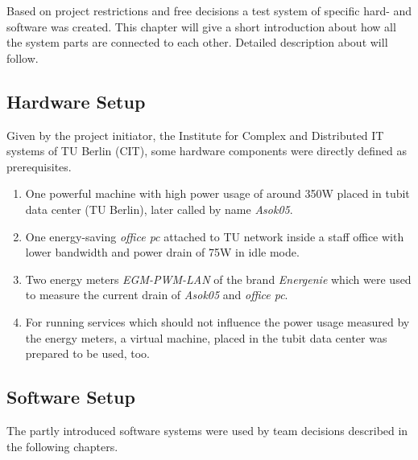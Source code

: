 Based on project restrictions and free decisions a test system of specific hard- and software was created. This chapter will give a short introduction about how all the system parts are connected to each other. Detailed description about will follow.

\subsection{Hardware Setup}

Given by the project initiator, the Institute for Complex and Distributed IT systems of TU Berlin (CIT), some hardware components were directly defined as prerequisites.

\begin{enumerate}

\item One powerful machine with high power usage of around 350W placed in tubit data center (TU Berlin), later called by name \textit{Asok05}.

\item One energy-saving \textit{office pc} attached to TU network inside a staff office with lower bandwidth and power drain of 75W in idle mode.

\item Two energy meters \textit{EGM-PWM-LAN} of the brand \textit{Energenie} which were used to measure the current drain of \textit{Asok05} and \textit{office pc}.

\item For running services which should not influence the power usage measured by the energy meters, a virtual machine, placed in the tubit data center was prepared to be used, too.

\end{enumerate}


\subsection{Software Setup}

The partly introduced software systems were used by team decisions described in the following chapters.

